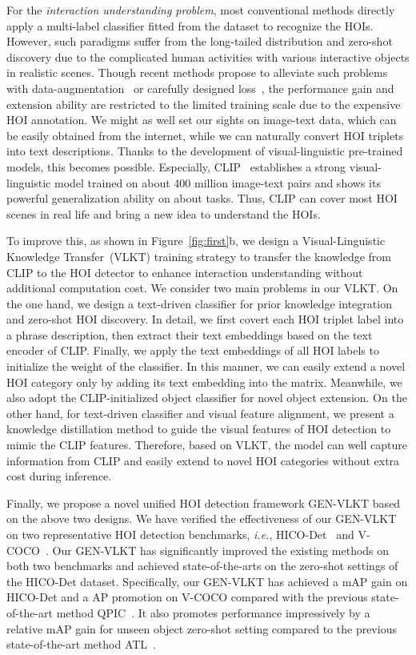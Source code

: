 \documentclass[10pt,twocolumn,letterpaper]{article}
\begin{document}
For the \emph{interaction understanding problem}, most conventional methods directly apply a multi-label classifier fitted from the dataset to recognize the HOIs.
However, such paradigms suffer from the long-tailed distribution and zero-shot discovery due to the complicated human activities with various interactive objects in realistic scenes. Though recent methods propose to alleviate such problems with data-augmentation~\cite{hou2021affordance} or carefully designed loss~\cite{zhong2021glance}, the performance gain and extension ability are restricted to the limited training scale due to the expensive HOI annotation. We might as well set our sights on image-text data, which can be easily obtained from the internet, while we can naturally convert HOI triplets into text descriptions. Thanks to the development of visual-linguistic pre-trained models, this becomes possible. Especially, CLIP~\cite{radford2021learning} establishes a strong visual-linguistic model trained on about 400 million image-text pairs and shows its powerful generalization ability on about  tasks. Thus, CLIP can cover most HOI scenes in real life and bring a new idea to understand the HOIs. 

To improve this, as shown in Figure~\ref{fig:first}b, we design a Visual-Linguistic Knowledge Transfer~(VLKT) training strategy to transfer the knowledge from CLIP to the HOI detector to enhance interaction understanding without additional computation cost. We consider two main problems in our VLKT. On the one hand, we design a text-driven classifier for prior knowledge integration and zero-shot HOI discovery. In detail, we first covert each HOI triplet label into a phrase description, then extract their text embeddings based on the text encoder of CLIP. Finally,  we apply the text embeddings of all HOI labels to initialize the weight of the classifier. In this manner, we can easily extend a novel HOI category only by adding its text embedding into the matrix. Meanwhile, we also adopt the CLIP-initialized object classifier for novel object extension. On the other hand, for text-driven classifier and visual feature alignment, we present a knowledge distillation method to guide the visual features of HOI detection to mimic the CLIP features. Therefore, based on VLKT, the model can well capture information from CLIP and easily extend to novel HOI categories without extra cost during inference.

Finally, we propose a novel unified HOI detection framework GEN-VLKT based on the above two designs. We have verified the effectiveness of our GEN-VLKT on two representative HOI detection benchmarks, \emph{i.e.}, HICO-Det~\cite{qi2018learning}
 and V-COCO~\cite{gupta2015visual}. Our GEN-VLKT has significantly improved the existing methods on both two benchmarks and achieved state-of-the-arts on the zero-shot settings of the HICO-Det dataset. Specifically, our GEN-VLKT has achieved a  mAP gain on HICO-Det and a  AP promotion on V-COCO compared with the previous state-of-the-art method QPIC~\cite{tamura2021qpic}. It also promotes performance impressively by a  relative mAP gain for unseen object zero-shot setting compared to the previous state-of-the-art method ATL~\cite{hou2021affordance}. 
 
\end{document}
